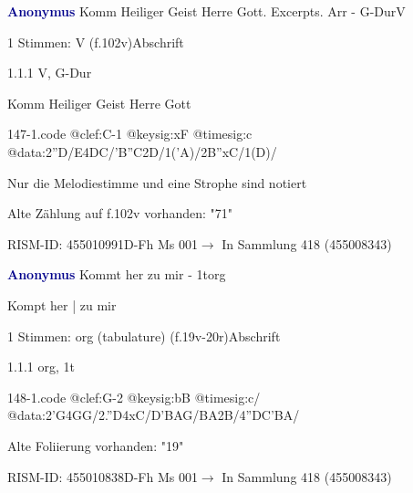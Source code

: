 \documentclass[twocolumn, 12pt]{book}
\begin{document}
\par \vspace{16pt} \textcolor{darkblue}{\textbf{Anonymus  }}\hfillplus{\textbf{[147]}}\newline Komm Heiliger Geist Herre Gott. Excerpts. Arr - G-Dur\newline V
\par \begin{itshape}\end{itshape} 
\par \textcolor{darkblue}{}  1 Stimmen: V  (f.102v)\newline Abschrift
\par 1.1.1  V, G-Dur\newline \begin{footnotesize} Komm Heiliger Geist Herre Gott \end{footnotesize}  
\begin{filecontents*}{147-1.code}
@clef:C-1
@keysig:xF
@timesig:c
@data:2''D/E4DC/'B''C2D/1('A)/2B''xC/1(D)/
\end{filecontents*}
\newline %
\par Nur die Melodiestimme und eine Strophe sind notiert
\par Alte Zählung auf f.102v vorhanden: "71"
\par RISM-ID: 455010991\newline D-Fh  Ms 001\newline $\rightarrow$ In Sammlung 418 (455008343)
      
\par \vspace{16pt} \textcolor{darkblue}{\textbf{Anonymus  }}\hfillplus{\textbf{[148]}}\newline Kommt her zu mir - 1t\newline org
\par \begin{itshape}[f.19v, at left:] Kompt her | zu mir\end{itshape} 
\par \textcolor{darkblue}{}  1 Stimmen: org (tabulature)  (f.19v-20r)\newline Abschrift
\par 1.1.1  org, 1t  
\begin{filecontents*}{148-1.code}
@clef:G-2
@keysig:bB
@timesig:c/
@data:2'G4GG/2.''D4xC/D'BAG/BA2B/4''DC'BA/
\end{filecontents*}
\newline %
\par Alte Foliierung vorhanden: "19"
\par RISM-ID: 455010838\newline D-Fh  Ms 001\newline $\rightarrow$ In Sammlung 418 (455008343)
      
\end{document}
